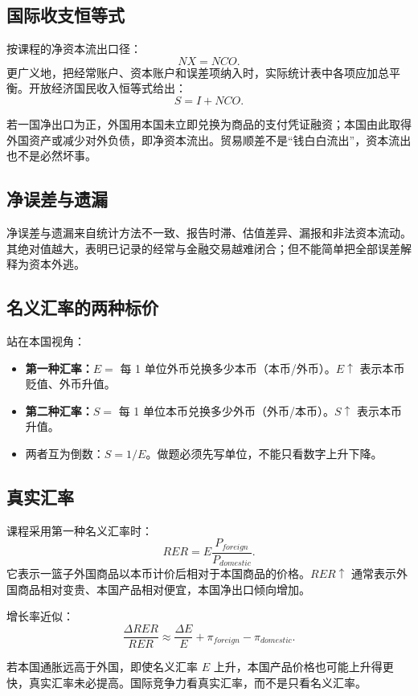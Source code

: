 \documentclass[UTF8,11pt,a4paper]{ctexart}
\newcommand{\term}[1]{\textbf{#1}}
\begin{document}
\subsection{国际收支恒等式}
按课程的净资本流出口径：
\[
NX=NCO.
\]
更广义地，把经常账户、资本账户和误差项纳入时，实际统计表中各项应加总平衡。开放经济国民收入恒等式给出：
\[
S=I+NCO.
\]
\begin{detailbox}[实物面与金融面是同一交易的两面]
若一国净出口为正，外国用本国未立即兑换为商品的支付凭证融资；本国由此取得外国资产或减少对外负债，即净资本流出。贸易顺差不是“钱白白流出”，资本流出也不是必然坏事。
\end{detailbox}

\subsection{净误差与遗漏}
净误差与遗漏来自统计方法不一致、报告时滞、估值差异、漏报和非法资本流动。其绝对值越大，表明已记录的经常与金融交易越难闭合；但不能简单把全部误差解释为资本外逃。

\subsection{名义汇率的两种标价}
站在本国视角：
\begin{itemize}
  \item \term{第一种汇率：}$E=$ 每 1 单位外币兑换多少本币（本币/外币）。$E\uparrow$ 表示本币贬值、外币升值。
  \item \term{第二种汇率：}$S=$ 每 1 单位本币兑换多少外币（外币/本币）。$S\uparrow$ 表示本币升值。
  \item 两者互为倒数：$S=1/E$。做题必须先写单位，不能只看数字上升下降。
\end{itemize}

\subsection{真实汇率}
课程采用第一种名义汇率时：
\[
RER=E\frac{P_{foreign}}{P_{domestic}}.
\]
它表示一篮子外国商品以本币计价后相对于本国商品的价格。$RER\uparrow$ 通常表示外国商品相对变贵、本国产品相对便宜，本国净出口倾向增加。

增长率近似：
\[
\frac{\Delta RER}{RER}\approx
\frac{\Delta E}{E}+\pi_{foreign}-\pi_{domestic}.
\]
\begin{warningbox}[名义贬值不必然真实贬值]
若本国通胀远高于外国，即使名义汇率 $E$ 上升，本国产品价格也可能上升得更快，真实汇率未必提高。国际竞争力看真实汇率，而不是只看名义汇率。
\end{warningbox}
\end{document}
